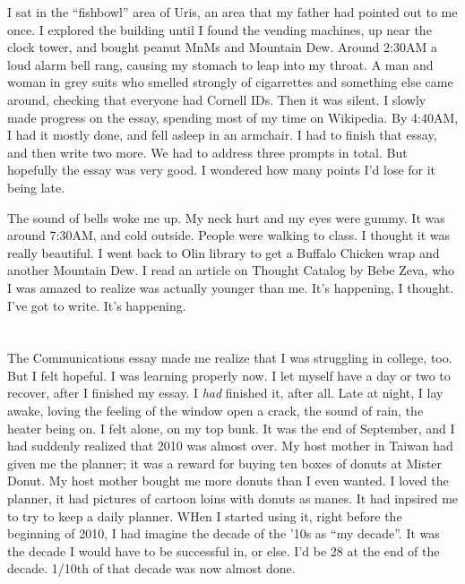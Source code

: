 I sat in the ``fishbowl'' area of Uris, an area that my father had pointed out
to me once.  I explored the building until I found the vending machines, up near
the clock tower, and bought peanut MnMs and Mountain Dew.  Around 2:30AM a loud
alarm bell rang, causing my stomach to leap into my throat.  A man and woman in
grey suits who smelled strongly of cigarrettes and something else came around,
checking that everyone had Cornell IDs.  Then it was silent.  I slowly made
progress on the essay, spending most of my time on Wikipedia.  By 4:40AM, I had it
mostly done, and fell asleep in an armchair.  I had to finish that essay, and
then write two more.  We had to address three prompts in total.  But hopefully
the essay was very good.  I wondered how many points I'd lose for it being late.

The sound of bells woke me up.  My neck hurt and my eyes were gummy.  It was
around 7:30AM, and cold outside.  People were walking to class.  I thought it
was really beautiful.  I went back to Olin library to get a Buffalo Chicken
wrap and another Mountain Dew.  I read an article on Thought Catalog by Bebe
Zeva, who I was amazed to realize was actually younger than me.  It's happening,
I thought.  I've got to write.  It's happening.

\section{}

The Communications essay made me realize that I was struggling in college, too.
But I felt hopeful. I was learning properly now.  I let myself have a  day or
two to recover, after I finished my essay.  I \textit{had} finished it, after
all.  Late at night, I lay awake, loving the feeling of the window open a crack,
the sound of rain, the heater being on.  I felt alone, on my top bunk.  It was
the end of September, and I had suddenly realized that 2010 was almost over.  My
host mother in Taiwan had given me the planner; it was a reward for buying ten
boxes of donuts at Mister Donut.  My host mother bought me more donuts than I
even wanted.  I loved the planner, it had pictures of cartoon loins with donuts
as manes.  It had inpsired me to try to keep a daily planner.  WHen I started
using it, right before the beginning of 2010, I had imagine the decade of the
'10s as ``my decade''.  It was the decade I would have to be successful in, or
else.  I'd be 28 at the end of the decade.  1/10th of that decade was now almost
done.

